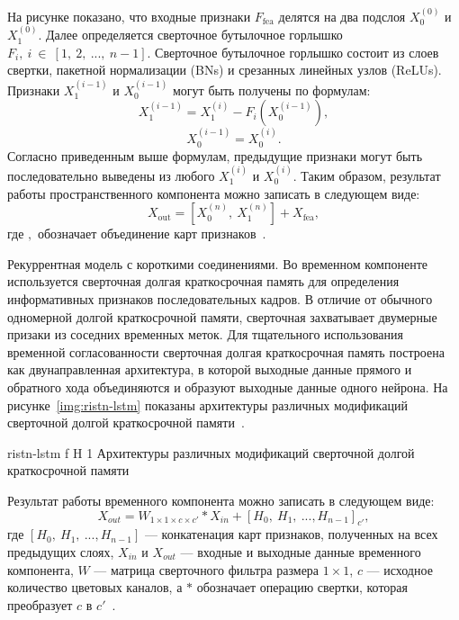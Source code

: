 \documentclass{bmstu}
\begin{document}
На рисунке показано, что входные признаки $F_{\text{fea}}$ делятся на два подслоя $X^{(0)}_{0}$ и $X^{(0)}_{1}$. 
Далее определяется сверточное бутылочное горлышко $F_i,~i~\in~[1,~2,~...,~n - 1]$. 
Сверточное бутылочное горлышко состоит из слоев свертки, пакетной нормализации (BNs) и срезанных линейных узлов (ReLUs). 
Признаки $X^{(i - 1)}_{1}$ и $X^{(i - 1)}_{0}$ могут быть получены по формулам:
\begin{equation}
X^{(i - 1)}_{1} = X^{(i)}_{1} - F_{i}(X^{(i - 1)}_{0}),
\end{equation}
\begin{equation}
X^{(i - 1)}_{0} = X^{(i)}_{0}.
\end{equation}
Согласно приведенным выше формулам, предыдущие признаки могут быть последовательно выведены из любого $X^{(i)}_{1}$ и $X^{(i)}_{0}$. 
Таким образом, результат работы пространственного компонента можно записать в следующем виде:
\begin{equation}
X_{\text{out}} = [X^{(n)}_{0},~X^{(n)}_{1}] + X_{\text{fea}},
\end{equation}
где $,$ обозначает объединение карт признаков~\cite{Xiaobin2019}.

Рекуррентная модель с короткими соединениями. 
Во временном компоненте используется сверточная долгая краткосрочная память для определения информативных признаков последовательных кадров. 
В отличие от обычного одномерной долгой краткосрочной памяти, сверточная захватывает двумерные призаки из соседних временных меток. 
Для тщательного использования временной согласованности сверточная долгая краткосрочная память построена как двунаправленная архитектура, в которой выходные данные прямого и обратного хода объединяются и образуют выходные данные одного нейрона. 
На рисунке~\ref{img:ristn-lstm} показаны архитектуры различных модификаций сверточной долгой краткосрочной памяти~\cite{Xiaobin2019}.

    {ristn-lstm}
    {f}
    {H}
    {1\textwidth}
    {Архитектуры различных модификаций сверточной долгой краткосрочной памяти~\cite{Xiaobin2019}}
    
Результат работы временного компонента можно записать в следующем виде:
\begin{equation}
X_{out} = W_{1 \times 1 \times c \times c'} * X_{in} + [H_0,~H_1,~...,H_{n - 1}]_{c'},
\end{equation}
где $[H_0,~H_1,~...,H_{n - 1}]$ --- конкатенация карт признаков, полученных на всех предыдущих слоях, $X_{in}$ и $X_{out}$ --- входные и выходные данные временного компонента, $W$ --- матрица сверточного фильтра размера $1 \times 1$, $c$ --- исходное количество цветовых каналов, а $*$ обозначает операцию свертки, которая преобразует $c$ в $c'$~\cite{Xiaobin2019}.
\end{document}
